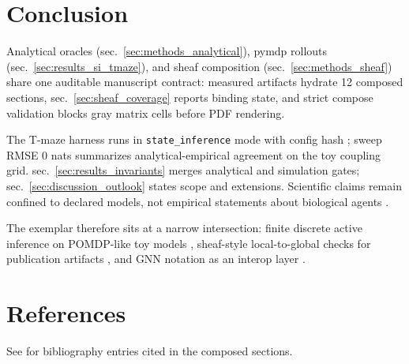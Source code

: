 \documentclass[
  english,
]{article}
\begin{document}
\newpage

\section{Conclusion}\label{sec:conclusion}

Analytical oracles (sec.~\ref{sec:methods_analytical}), pymdp rollouts
(sec.~\ref{sec:results_si_tmaze}), and sheaf composition
(sec.~\ref{sec:methods_sheaf}) share one auditable manuscript contract:
measured artifacts hydrate 12 composed sections,
sec.~\ref{sec:sheaf_coverage} reports binding state, and strict compose
validation blocks gray matrix cells before PDF rendering.

The T-maze harness runs in \texttt{state\_inference} mode with config
hash ; sweep RMSE 0 nats summarizes
analytical-empirical agreement on the toy coupling grid.
sec.~\ref{sec:results_invariants} merges analytical and simulation
gates; sec.~\ref{sec:discussion_outlook} states scope and extensions.
Scientific claims remain confined to declared models, not empirical
statements about biological agents \citep{gershman2019fepbrain}.

The exemplar therefore sits at a narrow intersection: finite discrete
active inference on POMDP-like toy models
\citep{dacosta2020discrete, friston2021sophisticated, dacosta2023reward},
sheaf-style local-to-global checks for publication artifacts
\citep{curry2014sheaves, robinson2014topological}, and GNN notation as
an interop layer \citep{gnn2023}.

\newpage

\section{References}\label{references}

See  for bibliography entries cited in
the composed sections.

\newpage



\clearpage
\end{document}
